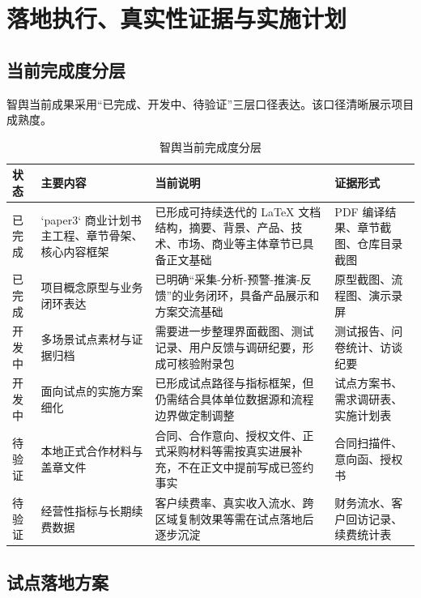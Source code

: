\chapter{落地执行、真实性证据与实施计划}

\section{当前完成度分层}

智舆当前成果采用“已完成、开发中、待验证”三层口径表达。该口径清晰展示项目成熟度。

\begin{table}[htbp]
	\centering
	\caption{智舆当前完成度分层}
	\begin{tabularx}{\textwidth}{L{2.2cm}L{4.1cm}Y L{3.3cm}}
		\toprule
		状态  & 主要内容                          & 当前说明                                               & 证据形式                 \\
		\midrule
		已完成 & `paper3` 商业计划书主工程、章节骨架、核心内容框架 & 已形成可持续迭代的 LaTeX 文档结构，摘要、背景、产品、技术、市场、商业等主体章节已具备正文基础 & PDF 编译结果、章节截图、仓库目录截图 \\
		已完成 & 项目概念原型与业务闭环表达                 & 已明确“采集-分析-预警-推演-反馈”的业务闭环，具备产品展示和方案交流基础             & 原型截图、流程图、演示录屏        \\
		开发中 & 多场景试点素材与证据归档                  & 需要进一步整理界面截图、测试记录、用户反馈与调研纪要，形成可核验附录包                & 测试报告、问卷统计、访谈纪要       \\
		开发中 & 面向试点的实施方案细化                   & 已形成试点路径与指标框架，但仍需结合具体单位数据源和流程边界做定制调整                & 试点方案书、需求调研表、实施计划表    \\
		待验证 & 本地正式合作材料与盖章文件                 & 合同、合作意向、授权文件、正式采购材料等需按真实进展补充，不在正文中提前写成已签约事实        & 合同扫描件、意向函、授权书        \\
		待验证 & 经营性指标与长期续费数据                  & 客户续费率、真实收入流水、跨区域复制效果等需在试点落地后逐步沉淀                   & 财务流水、客户回访记录、续费统计表    \\
		\bottomrule
	\end{tabularx}
\end{table}

\section{试点落地方案}


